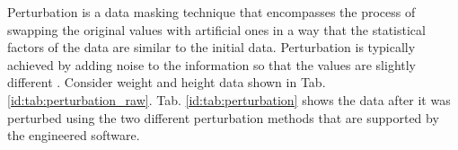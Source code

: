\documentclass[a4paper,twoside,12pt]{book}
\begin{document}
Perturbation is a data masking technique that encompasses the process of swapping the original values with artificial ones in a way that the statistical factors of the data are similar to the initial data. Perturbation is typically achieved by adding noise to the information so that the values are slightly different \cite{bib:anonymization_directory_structured}. 
%
Consider weight and height data shown in Tab. \ref{id:tab:perturbation_raw}.
%
%
Tab. \ref{id:tab:perturbation} shows the data after it was perturbed using the two different perturbation methods that are supported by the engineered software.
%
%
\end{document}
